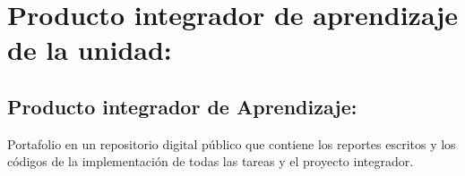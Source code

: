 \section{Producto integrador de aprendizaje de la unidad:}

\subsection{Producto integrador de Aprendizaje:}

\quad

Portafolio en un repositorio digital p\'{u}blico que contiene los
reportes escritos y los c\'{o}digos de la implementaci\'{o}n de todas
las tareas y el proyecto integrador.
